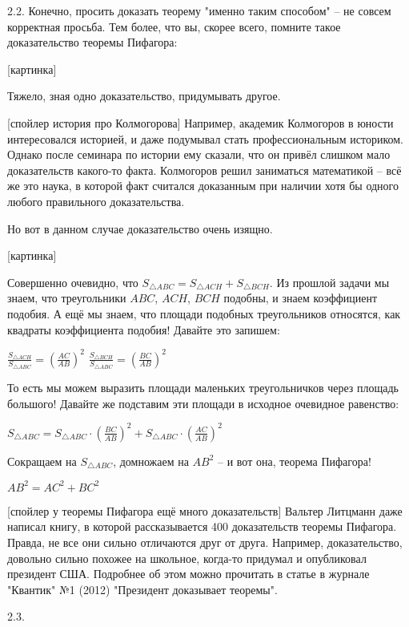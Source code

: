2.2. Конечно, просить доказать теорему "именно таким способом" -- не совсем корректная просьба. 
Тем более, что вы, скорее всего, помните такое доказательство теоремы Пифагора:

[картинка]

Тяжело, зная одно доказательство, придумывать другое.

[спойлер история про Колмогорова] 
Например, академик Колмогоров в юности интересовался историей, и даже подумывал стать профессиональным историком.
Однако после семинара по истории ему сказали, что он привёл слишком мало доказательств какого-то факта. Колмогоров 
решил заниматься математикой -- всё же это наука, в которой факт считался доказанным при наличии хотя бы одного любого
правильного доказательства.

Но вот в данном случае доказательство очень изящно.

[картинка]

Совершенно очевидно, что $S_{\triangle ABC} = S_{\triangle ACH} + S_{\triangle BCH}$. 
Из прошлой задачи мы знаем, что треугольники $ABC$, $ACH$, $BCH$ подобны, и знаем коэффициент подобия.
А ещё мы знаем, что площади подобных треугольников относятся, как квадраты коэффициента подобия!
Давайте это запишем:

$\frac{S_{\triangle ACH}}{S_{\triangle ABC}} = \left(\frac{AC}{AB}\right)^2$
$\frac{S_{\triangle BCH}}{S_{\triangle ABC}} = \left(\frac{BC}{AB}\right)^2$

То есть мы можем выразить площади маленьких треугольничков через площадь большого! 
Давайте же подставим эти площади в исходное очевидное равенство:

$S_{\triangle ABC} = S_{\triangle ABC} \cdot \left(\frac{BC}{AB}\right)^2 + S_{\triangle ABC} \cdot \left(\frac{AC}{AB}\right)^2$

Сокращаем на $S_{\triangle ABC}$, домножаем на $AB^2$ -- и вот она, теорема Пифагора!

$AB^2 = AC^2 + BC^2$


[спойлер у теоремы Пифагора ещё много доказательств] 
Вальтер Литцманн даже написал книгу, в которой рассказывается 400 доказательств теоремы Пифагора. 
Правда, не все они сильно отличаются друг от друга.
Например, доказательство, довольно сильно похожее на школьное, когда-то придумал и опубликовал президент США.
Подробнее об этом можно прочитать в статье в журнале "Квантик" №1 (2012) "Президент доказывает теоремы".

2.3. 
